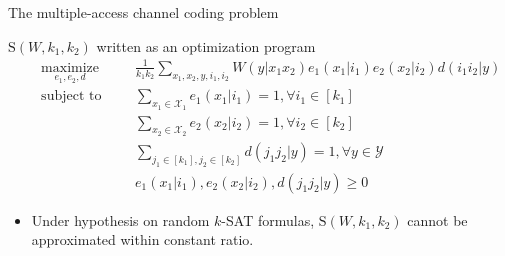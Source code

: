 \documentclass{beamer}
\theoremstyle{definition}
\theoremstyle{remark}
\DeclareMathOperator{\maxi}{\text{maximize}}
\DeclareMathOperator{\st}{\text{subject to}}
\begin{document}
\begin{frame}{The multiple-access channel coding problem}
\begin{itemize}
{\begin{center}
    \end{center}}
  \end{itemize}
\end{frame}

\begin{frame}{$\mathrm{S}(W,k_1,k_2)$ written as an optimization program}
\begin{equation*}
  \begin{aligned}
    &&\underset{e_1,e_2,d}{\maxi} &&& \frac{1}{k_1k_2} \sum_{x_1,x_2,y,i_1,i_2} W(y|x_1x_2)e_1(x_1|i_1)e_2(x_2|i_2)d(i_1i_2|y)\\
    &&\st &&& \sum_{x_1 \in \mathcal{X}_1} e_1(x_1|i_1) = 1, \forall i_1 \in [k_1]\\
    &&&&&  \sum_{x_2 \in \mathcal{X}_2} e_2(x_2|i_2) = 1, \forall i_2 \in [k_2]\\
    &&&&& \sum_{j_1 \in [k_1],j_2 \in [k_2]} d(j_1j_2|y) = 1, \forall y \in \mathcal{Y}\\
    &&&&& e_1(x_1|i_1), e_2(x_2|i_2), d(j_1j_2|y) \geq 0
  \end{aligned}
\end{equation*}
\pause
\begin{itemize}
\item Under hypothesis on random $k$-SAT formulas, $\mathrm{S}(W,k_1,k_2)$ cannot be approximated within constant ratio.
\end{itemize}
\end{frame}
\end{document}
